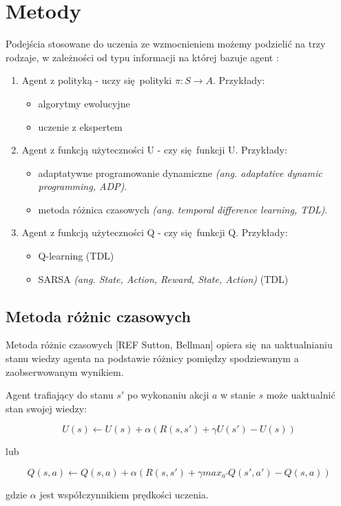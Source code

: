 \section{Metody}

Podejścia stosowane do uczenia ze wzmocnieniem możemy podzielić na trzy rodzaje, w zależności od typu informacji na której bazuje agent \cite{wjaskowski2016}:

\begin{enumerate}
\item Agent z polityką - uczy się polityki  $\pi: S \rightarrow A$. Przykłady:
\begin{itemize}
\item algorytmy ewolucyjne
\item uczenie z ekspertem
\end{itemize}
\item Agent z funkcją użyteczności U - czy się funkcji U. Przykłady:
\begin{itemize}
\item adaptatywne programowanie dynamiczne \textit{(ang. adaptative dynamic programming, ADP)}.
\item metoda różnica czasowych \textit{(ang. temporal difference learning, TDL)}.
\end{itemize}
\item Agent z funkcją użyteczności Q - czy się funkcji Q. Przykłady:
\begin{itemize}
\item Q-learning (TDL)
\item SARSA \textit{(ang. State, Action, Reward, State, Action)} (TDL)
\end{itemize}
\end{enumerate}

\subsection{Metoda różnic czasowych}

Metoda różnic czasowych [REF Sutton, Bellman] opiera się na uaktualnianiu stanu wiedzy agenta na podstawie różnicy pomiędzy spodziewanym a zaobserwowanym wynikiem.

Agent trafiający do stanu $s'$ po wykonaniu akcji $a$ w stanie $s$ może uaktualnić stan swojej wiedzy:

$$U(s) \leftarrow U(s) + \alpha (R(s,s') + \gamma U(s') - U (s))$$

lub

$$Q(s,a) \leftarrow Q(s,a) + \alpha (R(s,s') + \gamma max_{a'}Q(s',a') - Q (s,a))$$

gdzie $\alpha$ jest współczynnikiem prędkości uczenia.







